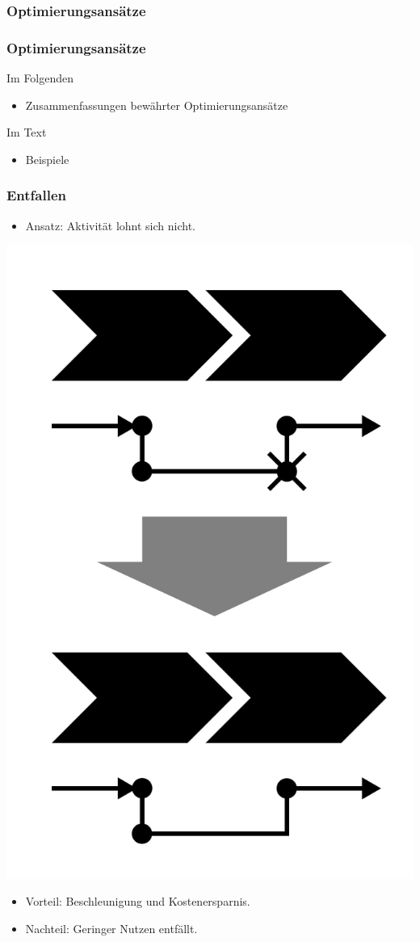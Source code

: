 \documentclass{beamer}
\begin{document}
 \subsubsection{Optimierungsansätze}
 \begin{frame}
  \frametitle{Optimierungsansätze}
  Im Folgenden
  \begin{itemize}
    \item Zusammenfassungen bewährter Optimierungsansätze
  \end{itemize}
  Im Text
  \begin{itemize}
    \item Beispiele
  \end{itemize}
 \end{frame}

 \begin{frame}
  \frametitle{Entfallen}
   \begin{itemize}
    \item Ansatz: Aktivität lohnt sich nicht.
   \end{itemize}
  \centerline{\includegraphics[scale=2.5]{4_6_1.png}}
  \begin{itemize}
    \item Vorteil: Beschleunigung und Kostenersparnis.
    \item Nachteil: Geringer Nutzen entfällt.
  \end{itemize}
 \end{frame}
\end{document}
